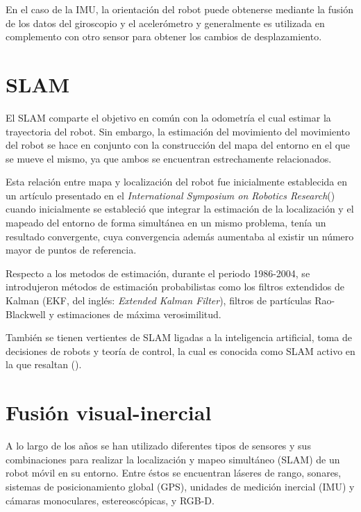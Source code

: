 En el caso de la IMU, la orientación del robot puede obtenerse mediante la fusión de los datos del giroscopio y el acelerómetro y generalmente es utilizada en complemento con otro sensor para obtener los cambios de desplazamiento. 

\section{SLAM}

El SLAM comparte el objetivo en común con la odometría el cual estimar la trayectoria del robot. Sin embargo, la estimación del movimiento del movimiento del robot se hace en conjunto con la construcción del mapa del entorno en el que se mueve el mismo, ya que ambos se encuentran estrechamente relacionados.

Esta relación entre mapa  y localización del robot  fue inicialmente establecida en un artículo presentado en el \textit{International Symposium on Robotics Research}() cuando inicialmente se estableció que integrar la estimación de la localización y el mapeado del entorno de forma simultánea en un mismo problema, tenía un resultado convergente, cuya convergencia además aumentaba al existir un número mayor de puntos de referencia. 

Respecto a los metodos de estimación, durante el periodo 1986-2004, se introdujeron métodos de estimación probabilistas  como los filtros extendidos de Kalman (EKF, del inglés: \textit{Extended Kalman Filter}), filtros de partículas Rao-Blackwell y estimaciones de máxima verosimilitud.

También se tienen vertientes de SLAM ligadas a la inteligencia artificial, toma de decisiones de robots y teoría de control, la cual es conocida como SLAM activo en la que resaltan ().











\section{Fusión visual-inercial }
A lo largo de los años se han utilizado diferentes tipos de sensores y sus combinaciones para realizar la localización y mapeo simultáneo (SLAM) de un robot móvil en su entorno. Entre éstos se encuentran láseres de rango, sonares, sistemas de posicionamiento global (GPS), unidades de medición inercial (IMU) y cámaras monoculares, estereoscópicas, y RGB-D.\\

